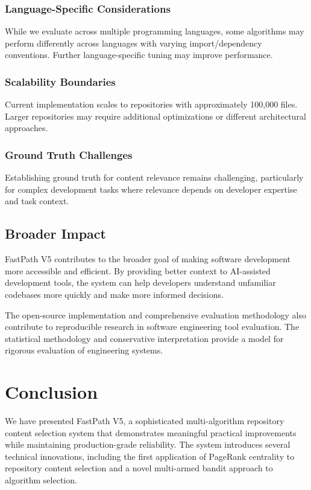 \documentclass[conference]{IEEEtran}
\begin{document}
\subsubsection{Language-Specific Considerations}
While we evaluate across multiple programming languages, some algorithms may perform differently across languages with varying import/dependency conventions. Further language-specific tuning may improve performance.

\subsubsection{Scalability Boundaries}
Current implementation scales to repositories with approximately 100,000 files. Larger repositories may require additional optimizations or different architectural approaches.

\subsubsection{Ground Truth Challenges}
Establishing ground truth for content relevance remains challenging, particularly for complex development tasks where relevance depends on developer expertise and task context.

\subsection{Broader Impact}

FastPath V5 contributes to the broader goal of making software development more accessible and efficient. By providing better context to AI-assisted development tools, the system can help developers understand unfamiliar codebases more quickly and make more informed decisions.

The open-source implementation and comprehensive evaluation methodology also contribute to reproducible research in software engineering tool evaluation. The statistical methodology and conservative interpretation provide a model for rigorous evaluation of engineering systems.

\section{Conclusion}

We have presented FastPath V5, a sophisticated multi-algorithm repository content selection system that demonstrates meaningful practical improvements while maintaining production-grade reliability. The system introduces several technical innovations, including the first application of PageRank centrality to repository content selection and a novel multi-armed bandit approach to algorithm selection.
\end{document}

